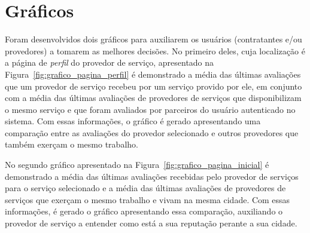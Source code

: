 \section{Gráficos}

Foram desenvolvidos dois gráficos para auxiliarem os usuários (contratantes e/ou provedores) a tomarem as melhores decisões. No primeiro deles, cuja localização é a página de \textit{perfil} do provedor de serviço, apresentado na Figura~\ref{fig:grafico_pagina_perfil} é demonstrado a média das últimas avaliações que um provedor de serviço recebeu por um serviço provido por ele, em conjunto com a média das últimas avaliações de provedores de serviços que disponibilizam o mesmo serviço e que foram avaliados por parceiros do usuário autenticado no sistema. Com essas informações, o gráfico é gerado apresentando uma comparação entre as avaliações do provedor selecionado e outros provedores que também exerçam o mesmo trabalho.

No segundo gráfico apresentado na Figura~\ref{fig:grafico_pagina_inicial} é demonstrado a média das últimas avaliações recebidas pelo provedor de serviços para o serviço selecionado e a média das últimas avaliações de provedores de serviços que exerçam o mesmo trabalho e vivam na mesma cidade. Com essas informações, é gerado o gráfico apresentando essa comparação, auxiliando o provedor de serviço a entender como está a sua reputação perante a sua cidade.	

